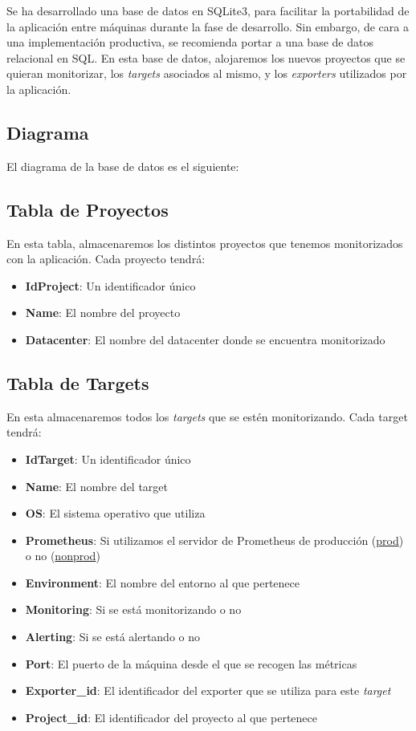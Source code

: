 Se ha desarrollado una base de datos en SQLite3\cite{sqlite}, para facilitar la portabilidad de la aplicación entre máquinas durante la fase de desarrollo. Sin embargo, de cara a una implementación productiva, se recomienda portar a una base de datos relacional en SQL.
En esta base de datos, alojaremos los nuevos proyectos que se quieran monitorizar, los \textit{targets} asociados al mismo, y los \textit{exporters} utilizados por la aplicación.

\subsection*{Diagrama}
El diagrama de la base de datos es el siguiente:


\subsection*{Tabla de Proyectos}
En esta tabla, almacenaremos los distintos proyectos que tenemos monitorizados con la aplicación. Cada proyecto tendrá:
\begin{itemize}
    \item \textbf{IdProject}: Un identificador único
    \item \textbf{Name}: El nombre del proyecto
    \item \textbf{Datacenter}: El nombre del datacenter donde se encuentra monitorizado
\end{itemize}

\subsection*{Tabla de Targets}
En esta almacenaremos todos los \textit{targets} que se estén monitorizando. Cada target tendrá:
\begin{itemize}
    \item \textbf{IdTarget}: Un identificador único
    \item \textbf{Name}: El nombre del target
    \item \textbf{OS}: El sistema operativo que utiliza
    \item \textbf{Prometheus}: Si utilizamos el servidor de Prometheus de producción (\url{prod}) o no (\url{nonprod})
    \item \textbf{Environment}: El nombre del entorno al que pertenece
    \item \textbf{Monitoring}: Si se está monitorizando o no
    \item \textbf{Alerting}: Si se está alertando o no
    \item \textbf{Port}: El puerto de la máquina desde el que se recogen las métricas
    \item \textbf{Exporter\_id}: El identificador del exporter que se utiliza para este \textit{target}
    \item \textbf{Project\_id}: El identificador del proyecto al que pertenece
\end{itemize}

